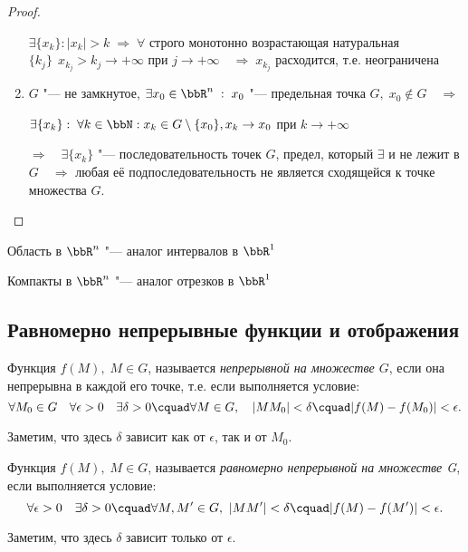 \begin{proof}
\begin{enumerate}[wide, labelwidth=!, labelindent=\parindent]
$\exists \{ x_k \}: |x_k| > k \; \Rightarrow \; \forall$ строго монотонно возрастающая натуральная $\{ k_j \}\ \  x_{k_j} > k_j \to +\infty$ при $j \to +\infty \quad \Rightarrow \; x_{k_j}$ расходится, т.е. неограничена 

\item

$G$ "--- не замкнутое, $\exists x_0 \in \bbR^n \;:\; x_0$ "--- предельная точка $G, \; x_0 \notin G \quad \Rightarrow$

$\exists \{ x_k \}: \; \forall k \in \bbN: x_k \in G \setminus \{ x_0 \}, x_k \to x_0$ при $k \to +\infty$

$\Rightarrow \quad \exists \{ x_k \}$ "--- последовательность точек $G$, предел, который $\exists$ и не лежит в $G \quad \Rightarrow$  любая её подпоследовательность не является сходящейся к точке множества $G$.\qedhere
\end{enumerate}
\end{proof}
Область в $\bbR^n$ "--- аналог интервалов в $\bbR^1$

Компакты в $\bbR^n$ "--- аналог отрезков в $\bbR^1$



\subsection{Равномерно непрерывные функции и отображения}

\begin{defn}
Функция $f(M),\;M\in G$, называется \textit{непрерывной на множестве $G$}, если она непрерывна в каждой его точке, т.е. если выполняется условие:
\begin{equation}\label{yaa45e1}
\forall M_0\in G\quad \forall\epsilon>0 \quad \exists\delta>0\cquad\forall M\in G,\quad |MM_0|<\delta\cquad|f(M)-f(M_0)|<\epsilon.
\end{equation}
\end{defn}
Заметим, что здесь $\delta$ зависит как от $\epsilon$, так и от $M_0$.

\begin{defn}
Функция $f(M),\; M\in G$, называется \textit{равномерно непрерывной на множестве G}, если выполняется условие:
\begin{equation}\label{yaa45e2}
\forall\epsilon>0\quad\exists\delta>0\cquad\forall M, M'\in G,\ |MM'|<\delta\cquad |f(M)-f(M')|<\epsilon.
\end{equation}
\end{defn}
Заметим, что здесь $\delta$ зависит только от $\epsilon$.

